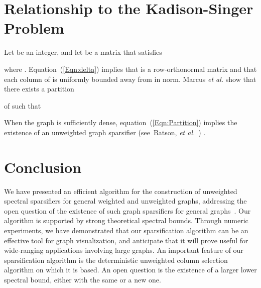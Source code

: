 \documentclass[final,leqno,onefignum,onetabnum]{siamltex1213}
\begin{document}
\section{Relationship to the Kadison-Singer Problem} 
Let  be an integer, and let  be a matrix that satisfies

where . Equation~(\ref{Eqn:delta}) implies that  is
a row-orthonormal matrix and that each column of  is uniformly
bounded away from  in norm. Marcus {\em et al.} \cite{Marcus2014} show that there exists a partition 

of  such that 

When the graph  is sufficiently dense, equation~(\ref{Eqn:Partition}) implies the existence of an unweighted graph sparsifier (see~Batson, {\em et al.}~\cite{ramanujansparse}) .

\section{Conclusion} We have presented an efficient algorithm for the construction of unweighted spectral sparsifiers for general weighted and unweighted graphs, addressing the open question of the existence of such graph sparsifiers for general graphs~\cite{ramanujansparse}.  Our algorithm is supported by strong theoretical spectral bounds.  Through numeric experiments, we have demonstrated that our sparsification algorithm can be an effective tool for graph visualization, and anticipate that it will prove useful for wide-ranging applications involving large graphs.  An important feature of our sparsification algorithm is the deterministic unweighted column selection algorithm on which it is based.  An open question is the existence of a larger lower spectral bound, either with the same  or a new one.\\



\end{document}

